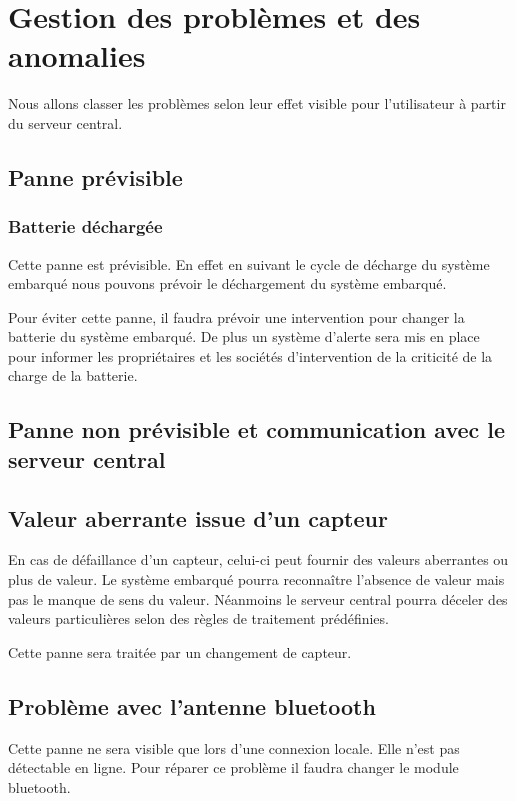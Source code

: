 \section{Gestion des problèmes et des anomalies}

Nous allons classer les problèmes selon leur effet visible pour l'utilisateur à 
partir du serveur central. 

\subsection{Panne prévisible}

\subsubsection{Batterie déchargée}

Cette panne est prévisible. En effet en suivant le cycle de décharge 
du système embarqué nous pouvons prévoir le déchargement du système embarqué. 

Pour éviter cette panne, il faudra prévoir une intervention pour changer la batterie
du système embarqué. De plus un système d'alerte sera mis en place pour informer 
les propriétaires et les sociétés d'intervention de la criticité de la charge 
de la batterie. 

\subsection{Panne non prévisible et communication avec le serveur central}

\subsection{Valeur aberrante issue d'un capteur}

En cas de défaillance d'un capteur, celui-ci peut fournir des valeurs 
aberrantes ou plus de valeur. Le système embarqué pourra reconnaître l'absence 
de valeur mais pas le manque de sens du valeur. Néanmoins le serveur central 
pourra déceler des valeurs particulières selon des règles de traitement 
prédéfinies. 

Cette panne sera traitée par un changement de capteur.

\subsection{Problème avec l'antenne bluetooth}

Cette panne ne sera visible que lors d'une connexion locale. Elle n'est pas 
détectable en ligne. Pour réparer ce problème il faudra changer le module bluetooth.

